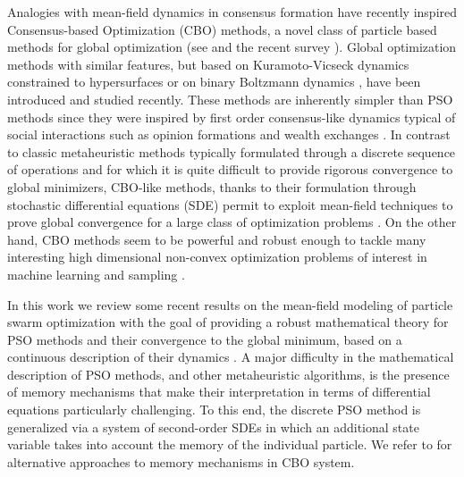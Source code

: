 \documentclass{ims9x6}
\begin{document}
Analogies with mean-field dynamics in consensus formation have recently inspired Consensus-based Optimization (CBO) methods, a novel class of particle based methods for global optimization (see \cite{pinnau2017consensus,carrillo2018analytical,carrillo2019consensus,TW,Totzeck2018ANC,ha2020convergence,ha2021convergence,chen2020consensusbased,fornasier2021consensusbased} and the recent survey \cite{totzeck2021trends}). Global optimization methods with similar features, but based on Kuramoto-Vicseck  dynamics constrained to hypersurfaces \cite{fhps20-1,fhps20-2,fornasier2021anisotropic} or on binary Boltzmann dynamics \cite{benfenati2021binary}, have been introduced and studied recently. These methods are inherently simpler than PSO methods since they were inspired by first order consensus-like dynamics typical of social interactions such as opinion formations and wealth exchanges \cite{partos13,NPT}.
In contrast to classic metaheuristic methods typically formulated through a discrete sequence of operations and for which it is quite difficult to provide rigorous convergence to global minimizers, CBO-like methods, thanks to their formulation through stochastic differential equations (SDE) permit to exploit mean-field techniques to prove global convergence for a large class of optimization problems \cite{carrillo2018analytical,carrillo2019consensus,fhps20-2,fornasier2021anisotropic}. On the other hand, CBO methods seem to be powerful and robust enough to tackle many interesting high dimensional non-convex optimization problems of interest in machine learning and sampling \cite{carrillo2019consensus,fhps20-2,chen2020consensusbased,carrillo2021consensus,benfenati2021binary,fornasier2021anisotropic,grassi2021consensus}. 


In this work we review some recent results on the mean-field modeling of particle swarm optimization with the goal of providing a robust mathematical theory for PSO methods and their convergence to the global minimum, based on a continuous description of their dynamics \cite{Grassi2021PSO,huang2021mean,huang2021mean1,cipriani2021zero,HJK,grassi2021consensus}. 
A major difficulty in the mathematical description of PSO methods, and other metaheuristic algorithms, is the presence of memory mechanisms that make their interpretation in terms of differential equations particularly challenging. To this end, 
the discrete PSO method is generalized via a system of second-order SDEs in which an additional state variable takes into account the memory of the individual particle. We refer to \cite{TW} for alternative approaches to memory mechanisms in CBO system. 
\end{document}

